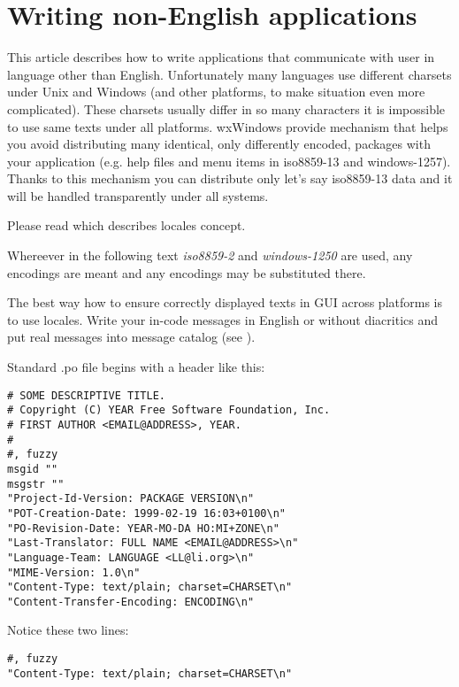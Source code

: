 \section{Writing non-English applications}\label{nonenglishoverview}

This article describes how to write applications that communicate with
user in language other than English. Unfortunately many languages use
different charsets under Unix and Windows (and other platforms, to make
situation even more complicated). These charsets usually differ in so
many characters it is impossible to use same texts under all platforms.
wxWindows provide mechanism that helps you avoid distributing many
identical, only differently encoded, packages with your application 
(e.g. help files and menu items in iso8859-13 and windows-1257). Thanks
to this mechanism you can distribute only let's say iso8859-13 data 
and it will be handled transparently under all systems.

Please read  which
describes locales concept.

Whereever in the following text {\it iso8859-2} and {\it windows-1250} are
used, any encodings are meant and any encodings may be substituted there.


The best way how to ensure correctly displayed texts in GUI across platforms
is to use locales. Write your in-code messages in English or without 
diacritics and put real messages into message catalog (see 
).

Standard .po file begins with a header like this:

\begin{verbatim}
# SOME DESCRIPTIVE TITLE.
# Copyright (C) YEAR Free Software Foundation, Inc.
# FIRST AUTHOR <EMAIL@ADDRESS>, YEAR.
#
#, fuzzy
msgid ""
msgstr ""
"Project-Id-Version: PACKAGE VERSION\n"
"POT-Creation-Date: 1999-02-19 16:03+0100\n"
"PO-Revision-Date: YEAR-MO-DA HO:MI+ZONE\n"
"Last-Translator: FULL NAME <EMAIL@ADDRESS>\n"
"Language-Team: LANGUAGE <LL@li.org>\n"
"MIME-Version: 1.0\n"
"Content-Type: text/plain; charset=CHARSET\n"
"Content-Transfer-Encoding: ENCODING\n"
\end{verbatim}

Notice these two lines:

\begin{verbatim}
#, fuzzy
"Content-Type: text/plain; charset=CHARSET\n"
\end{verbatim}

